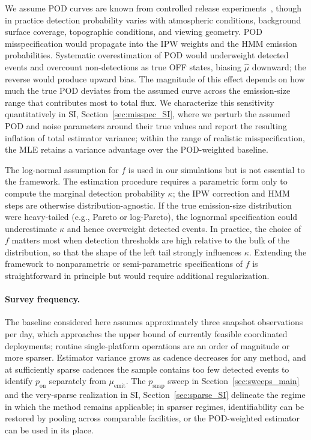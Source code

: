\documentclass[unnumsec,webpdf,modern,mediumone]{oup-authoring-template}
\newcommand{\new}[1]{{\color{blue}#1}}
\newcommand{\edit}[1]{{\color{magenta}#1}}
\begin{document}
We assume POD curves are known from controlled release experiments~\citep{Sherwin2023, ElAbbadi2024, chen2024comparing, mcmanemin2026controlled}, though in practice detection probability varies with atmospheric conditions, background surface coverage, topographic conditions, and viewing geometry. POD misspecification would propagate into the IPW weights and the HMM emission probabilities. Systematic overestimation of POD would underweight detected events and overcount non-detections as true OFF states, biasing $\hat{\mu}$ downward; the reverse would produce upward bias. The magnitude of this effect depends on how much the true POD deviates from the assumed curve across the emission-size range that contributes most to total flux. \edit{We characterize this sensitivity quantitatively in SI, Section~\ref{sec:misspec_SI}, where we perturb the assumed POD and noise parameters around their true values and report the resulting inflation of total estimator variance; within the range of realistic misspecification, the MLE retains a variance advantage over the POD-weighted baseline.}

\edit{The log-normal assumption for $f$ is used in our simulations but is not essential to the framework.} The estimation procedure requires a parametric form only to compute the marginal detection probability $\kappa$; the IPW correction and HMM steps are otherwise distribution-agnostic. If the true emission-size distribution were heavy-tailed (e.g., Pareto or log-Pareto), the lognormal specification could underestimate $\kappa$ and hence overweight detected events. In practice, the choice of $f$ matters most when detection thresholds are high relative to the bulk of the distribution, so that the shape of the left tail strongly influences $\kappa$. Extending the framework to nonparametric or semi-parametric specifications of $f$ is straightforward in principle but would require additional regularization.

\new{\paragraph{Survey frequency.} The baseline considered here assumes approximately three snapshot observations per day, which approaches the upper bound of currently feasible coordinated deployments; routine single-platform operations are an order of magnitude or more sparser. Estimator variance grows as cadence decreases for any method, and at sufficiently sparse cadences the sample contains too few detected events to identify $p_{\text{on}}$ separately from $\mu_{\text{emit}}$. The $p_{\text{snap}}$ sweep in Section~\ref{sec:sweeps_main} and the very-sparse realization in SI, Section~\ref{sec:sparse_SI} delineate the regime in which the method remains applicable; in sparser regimes, identifiability can be restored by pooling across comparable facilities, or the POD-weighted estimator can be used in its place.}
\end{document}
